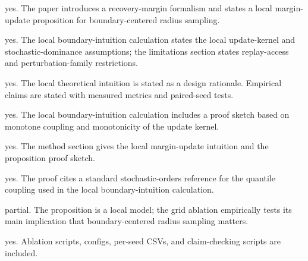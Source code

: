 \documentclass[letterpaper]{article}
\begin{document}
\begin{itemize}

yes. The paper introduces a recovery-margin formalism and states a local margin-update proposition for boundary-centered radius sampling.

        \begin{itemize}

			yes. The local boundary-intuition calculation states the local update-kernel and stochastic-dominance assumptions; the limitations section states replay-access and perturbation-family restrictions.

			yes. The local theoretical intuition is stated as a design rationale. Empirical claims are stated with measured metrics and paired-seed tests.

			yes. The local boundary-intuition calculation includes a proof sketch based on monotone coupling and monotonicity of the update kernel.

		yes. The method section gives the local margin-update intuition and the proposition proof sketch.

			yes. The proof cites a standard stochastic-orders reference for the quantile coupling used in the local boundary-intuition calculation.

		partial. The proposition is a local model; the grid ablation empirically tests its main implication that boundary-centered radius sampling matters.

		yes. Ablation scripts, configs, per-seed CSVs, and claim-checking scripts are included.

	\end{itemize}
\end{itemize}
\end{document}
